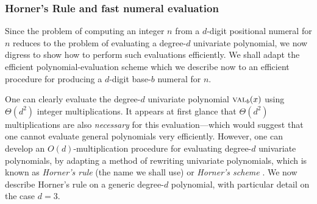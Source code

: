\subsubsection{Horner's Rule and fast numeral evaluation}

Since the problem of computing an integer $n$ from a $d$-digit positional numeral for $n$ reduces to the problem of evaluating a degree-$d$ univariate polynomial, we now digress to show how to perform such evaluations efficiently.  We shall adapt the efficient polynomial-evaluation scheme which we describe now to an efficient procedure for producing a $d$-digit base-$b$ numeral for $n$.

\medskip

 
 

One can clearly evaluate the degree-$d$ univariate polynomial $\mbox{\sc val}_{b}(x)$ using $\Theta(d^2)$ integer multiplications.  It appears at first glance that $\Theta(d^2)$ multiplications are also {\em necessary} for this evaluation---which would suggest that one cannot evaluate general polynomials very efficiently.  However, one can develop an $O(d)$-multiplication procedure for evaluating degree-$d$ univariate polynomials, by adapting a method of rewriting univariate polynomials, which is known as {\it Horner's rule} (the name we shall use) or {\it Horner's scheme} \cite{Horner}.  We now describe Horner's rule on a generic degree-$d$ polynomial, with particular detail on the case $d=3$.

\bigskip

\noindent {}

\bigskip

